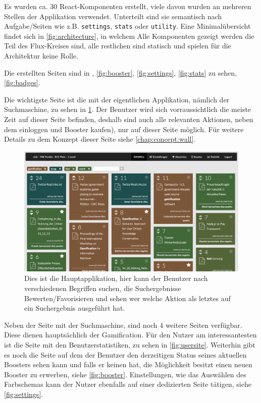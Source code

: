 \documentclass[12pt,twoside]{book}
\begin{document}
Es wurden ca. 30 React-Komponenten erstellt, viele davon wurden an mehreren Stellen der Applikation verwendet. Unterteilt sind sie semantisch nach Aufgabe/Seiten wie z.B. \texttt{settings}, \texttt{stats} oder \texttt{utility}.
Eine Minimalübersicht findet sich in \ref{fig:architecture}, in welchem Alle Komponenten gezeigt werden die Teil des Flux-Kreises sind, alle restlichen sind statisch und spielen für die Architektur keine Rolle.

Die erstellten Seiten sind in , \ref{fig:booster}, \ref{fig:settings}, \ref{fig:stats} zu sehen, \ref{fig:badges}.


Die wichtigste Seite ist die mit der eigentlichen Applikation, nämlich der Suchmaschine, zu sehen in \ref{fig:wall}. Der Benutzer wird sich vorraussichtlich die meiste Zeit auf dieser Seite befinden, deshalb sind auch alle relevanten Aktionen, neben dem einloggen und Booster kaufen), nur auf dieser Seite möglich. Für weitere Details zu dem Konzept dieser Seite siehe \ref{chap:concept:wall}.

\begin{figure}[htbp]
    \centering
    \includegraphics[width=1.0\textwidth]{images/infoboard_wall.png}
    \caption{Dies ist die Hauptapplikation, hier kann der Benutzer nach verschiedenen Begriffen suchen, die Suchergebnisse Bewerten/Favorisieren und sehen wer welche Aktion als letztes auf ein Suchergebnis ausgeführt hat.}
    \label{fig:wall}
\end{figure}

Neben der Seite mit der Suchmaschine, sind noch 4 weitere Seiten verfügbar. Diese dienen hauptsächlich der Gamification. Für den Nutzer am interessantesten ist die Seite mit den Benutzerstatistiken, zu sehen in \ref{fig:usersite}.
Weiterhin gibt es noch die Seite auf dem der Benutzer den derzeitigen Status seines aktuellen Boosters sehen kann und falls er keinen hat, die Möglichkeit besitzt einen neuen Booster zu erwerben, siehe \ref{fig:booster}. Einstellungen, wie das Auswählen des Farbschemas kann der Nutzer ebenfalls auf einer dedizierten Seite tätigen, siehe \ref{fig:settings}.
\end{document}
